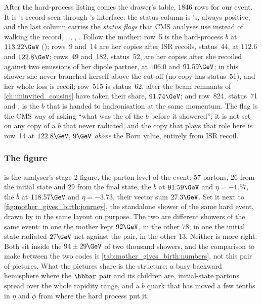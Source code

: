After the hard-process listing comes the drawer's table, 1846 rows for our
event. It is \PYTHIA's record seen through \CMSSW's 
interface: the status column is \PYTHIA's, always positive, and the last
column carries the \emph{status flags} that CMS analyses use instead of
walking the record, , ,
, . Follow the mother: row~5 is
the hard-process $b$ at $113.22\GeV$ ();
rows~9 and~14 are her copies after ISR recoils, status~44, at $112.6$ and
$122.8\GeV$; rows~49 and~182, status~52, are her copies after she recoiled
against two emissions of her dipole partner, at $106.0$ and $91.59\GeV$;
in this shower she never branched herself above the cut-off (no copy has
status~51), and her whole loss is recoil; row~515 is status~62, after the
beam remnants of \cref{ch:uninvited_cousins} have taken their share,
$91.74\GeV$; and row~824, status~71 and , is the $b$ that is
handed to hadronisation at the same momentum. The 
flag is the CMS way of asking ``what was the \pt of the $b$ before it
showered''; it is not set on any copy of a $b$ that never radiated, and
the copy that plays that role here is row~14 at $122.8\GeV$, $9\GeV$
\emph{above} the Born value, entirely from ISR recoil.

\subsubsection{The figure}

 is the analyser's stage-2 figure,
the parton level of the \CMSSW event: 57 partons, 26 from the initial state
and 29 from the final state, the $b$ at $91.59\GeV$ and $\eta=-1.57$, the
$\bar b$ at $118.57\GeV$ and $\eta=-3.73$, their vector sum $27.3\GeV$. Set
it next to \cref{fig:mother_gives_birth:journey}, the standalone shower of
the same hard event, drawn by  in the same layout
on purpose. The two are different showers of the same event: in one the
mother kept $92\GeV$, in the other $78$; in one the initial state radiated
$27\GeV$ net against the pair, in the other $13$. Neither is more right.
Both sit inside the $94\pm29\GeV$ of two thousand showers, and the
comparison to make between the two codes is
\cref{tab:mother_gives_birth:numbers}, not this pair of pictures. What the
pictures share is the structure: a busy backward hemisphere where the
$\bbbar$ pair and its children are, initial-state partons spread over the
whole rapidity range, and a $b$ quark that has moved a few tenths in
$\eta$ and $\phi$ from where the hard process put it.

